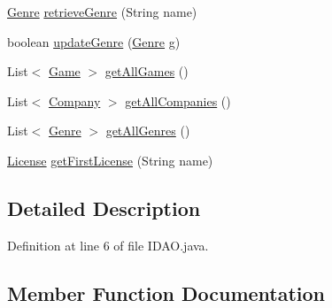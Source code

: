 \begin{DoxyCompactItemize}
\item 
\hyperlink{classes_1_1deusto_1_1server_1_1db_1_1data_1_1_genre}{Genre} \hyperlink{interfacees_1_1deusto_1_1server_1_1db_1_1dao_1_1_i_d_a_o_a8b15955637f9b81c57900761c6d03571}{retrieve\+Genre} (String name)
\item 
boolean \hyperlink{interfacees_1_1deusto_1_1server_1_1db_1_1dao_1_1_i_d_a_o_ae989ff2681d6afe8651a595340265c39}{update\+Genre} (\hyperlink{classes_1_1deusto_1_1server_1_1db_1_1data_1_1_genre}{Genre} g)
\item 
List$<$ \hyperlink{classes_1_1deusto_1_1server_1_1db_1_1data_1_1_game}{Game} $>$ \hyperlink{interfacees_1_1deusto_1_1server_1_1db_1_1dao_1_1_i_d_a_o_aebafef372cf3064b12d16fcb651b41ff}{get\+All\+Games} ()
\item 
List$<$ \hyperlink{classes_1_1deusto_1_1server_1_1db_1_1data_1_1_company}{Company} $>$ \hyperlink{interfacees_1_1deusto_1_1server_1_1db_1_1dao_1_1_i_d_a_o_ad83c37658f356cb69c1fa70f99416579}{get\+All\+Companies} ()
\item 
List$<$ \hyperlink{classes_1_1deusto_1_1server_1_1db_1_1data_1_1_genre}{Genre} $>$ \hyperlink{interfacees_1_1deusto_1_1server_1_1db_1_1dao_1_1_i_d_a_o_a96ad8de066318847a7828b12befe94f7}{get\+All\+Genres} ()
\item 
\hyperlink{classes_1_1deusto_1_1server_1_1db_1_1data_1_1_license}{License} \hyperlink{interfacees_1_1deusto_1_1server_1_1db_1_1dao_1_1_i_d_a_o_aef2783889a572e23bd57c5a2a955599a}{get\+First\+License} (String name)
\end{DoxyCompactItemize}


\subsection{Detailed Description}


Definition at line 6 of file I\+D\+A\+O.\+java.



\subsection{Member Function Documentation}
\mbox{\label{interfacees_1_1deusto_1_1server_1_1db_1_1dao_1_1_i_d_a_o_ad83c37658f356cb69c1fa70f99416579}} 
